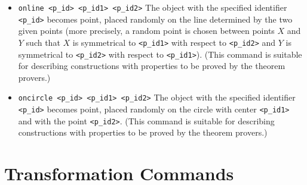 \documentclass[a4paper]{book}
\begin{document}
\begin{itemize}
\item \verb|online <p_id> <p_id1> <p_id2>|
        The object with the specified identifier \verb|<p_id>| becomes {\sc point},
        placed randomly on the line determined by the two given points
        (more precisely, a random point is chosen between points $X$ and $Y$
        such that $X$ is symmetrical to \verb|<p_id1>| with respect to \verb|<p_id2>|
        and $Y$ is symmetrical to \verb|<p_id2>| with respect to \verb|<p_id1>|).
        (This command is suitable for describing constructions with
        properties to be proved by the theorem provers.)

\item \verb|oncircle <p_id> <p_id1> <p_id2>|
        The object with the specified identifier \verb|<p_id>| becomes {\sc point},
        placed randomly on the circle with center \verb|<p_id1>| and with the point
        \verb|<p_id2>|. (This command is suitable for describing constructions with
        properties to be proved by the theorem provers.)
\end{itemize}


\section{Transformation Commands}
\end{document}
